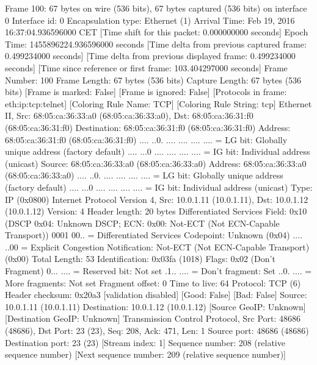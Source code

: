 Frame 100: 67 bytes on wire (536 bits), 67 bytes captured (536 bits) on interface 0
    Interface id: 0
    Encapsulation type: Ethernet (1)
    Arrival Time: Feb 19, 2016 16:37:04.936596000 CET
    [Time shift for this packet: 0.000000000 seconds]
    Epoch Time: 1455896224.936596000 seconds
    [Time delta from previous captured frame: 0.499234000 seconds]
    [Time delta from previous displayed frame: 0.499234000 seconds]
    [Time since reference or first frame: 103.404297000 seconds]
    Frame Number: 100
    Frame Length: 67 bytes (536 bits)
    Capture Length: 67 bytes (536 bits)
    [Frame is marked: False]
    [Frame is ignored: False]
    [Protocols in frame: eth:ip:tcp:telnet]
    [Coloring Rule Name: TCP]
    [Coloring Rule String: tcp]
Ethernet II, Src: 68:05:ca:36:33:a0 (68:05:ca:36:33:a0), Dst: 68:05:ca:36:31:f0 (68:05:ca:36:31:f0)
    Destination: 68:05:ca:36:31:f0 (68:05:ca:36:31:f0)
        Address: 68:05:ca:36:31:f0 (68:05:ca:36:31:f0)
        .... ..0. .... .... .... .... = LG bit: Globally unique address (factory default)
        .... ...0 .... .... .... .... = IG bit: Individual address (unicast)
    Source: 68:05:ca:36:33:a0 (68:05:ca:36:33:a0)
        Address: 68:05:ca:36:33:a0 (68:05:ca:36:33:a0)
        .... ..0. .... .... .... .... = LG bit: Globally unique address (factory default)
        .... ...0 .... .... .... .... = IG bit: Individual address (unicast)
    Type: IP (0x0800)
Internet Protocol Version 4, Src: 10.0.1.11 (10.0.1.11), Dst: 10.0.1.12 (10.0.1.12)
    Version: 4
    Header length: 20 bytes
    Differentiated Services Field: 0x10 (DSCP 0x04: Unknown DSCP; ECN: 0x00: Not-ECT (Not ECN-Capable Transport))
        0001 00.. = Differentiated Services Codepoint: Unknown (0x04)
        .... ..00 = Explicit Congestion Notification: Not-ECT (Not ECN-Capable Transport) (0x00)
    Total Length: 53
    Identification: 0x03fa (1018)
    Flags: 0x02 (Don't Fragment)
        0... .... = Reserved bit: Not set
        .1.. .... = Don't fragment: Set
        ..0. .... = More fragments: Not set
    Fragment offset: 0
    Time to live: 64
    Protocol: TCP (6)
    Header checksum: 0x20a3 [validation disabled]
        [Good: False]
        [Bad: False]
    Source: 10.0.1.11 (10.0.1.11)
    Destination: 10.0.1.12 (10.0.1.12)
    [Source GeoIP: Unknown]
    [Destination GeoIP: Unknown]
Transmission Control Protocol, Src Port: 48686 (48686), Dst Port: 23 (23), Seq: 208, Ack: 471, Len: 1
    Source port: 48686 (48686)
    Destination port: 23 (23)
    [Stream index: 1]
    Sequence number: 208    (relative sequence number)
    [Next sequence number: 209    (relative sequence number)]

